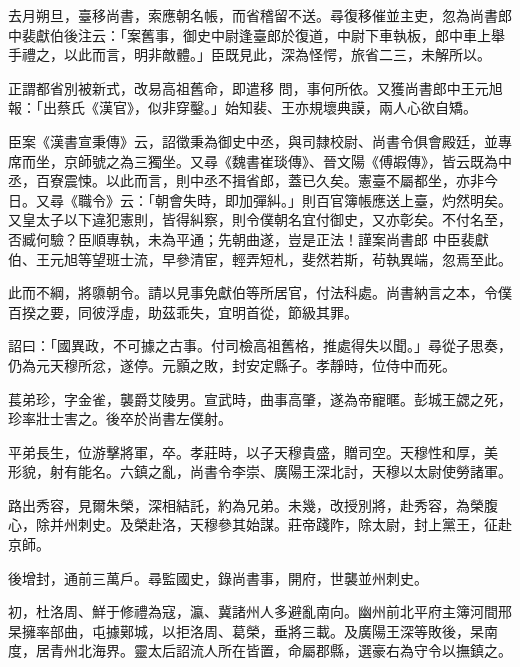 \begin{pinyinscope}
 去月朔旦，臺移尚書，索應朝名帳，而省稽留不送。尋復移催並主吏，忽為尚書郎中裴獻伯後注云：「案舊事，御史中尉逢臺郎於復道，中尉下車執板，郎中車上舉手禮之，以此而言，明非敵體。」臣既見此，深為怪愕，旅省二三，未解所以。



 正謂都省別被新式，改易高祖舊命，即遣移
 問，事何所依。又獲尚書郎中王元旭報：「出蔡氏《漢官》，似非穿鑿。」始知裴、王亦規壞典謨，兩人心欲自矯。



 臣案《漢書宣秉傳》云，詔徵秉為御史中丞，與司隸校尉、尚書令俱會殿廷，並專席而坐，京師號之為三獨坐。又尋《魏書崔琰傳》、晉文陽《傅嘏傳》，皆云既為中丞，百寮震悚。以此而言，則中丞不揖省郎，蓋已久矣。憲臺不屬都坐，亦非今日。又尋《職令》云：「朝會失時，即加彈糾。」則百官簿帳應送上臺，灼然明矣。又皇太子以下違犯憲則，皆得糾察，則令僕朝名宜付御史，又亦彰矣。不付名至，否臧何驗？臣順專執，未為平通；先朝曲遂，豈是正法！謹案尚書郎
 中臣裴獻伯、王元旭等望班士流，早參清宦，輕弄短札，斐然若斯，茍執異端，忽焉至此。



 此而不綱，將隳朝令。請以見事免獻伯等所居官，付法科處。尚書納言之本，令僕百揆之要，同彼浮虛，助茲乖失，宜明首從，節級其罪。



 詔曰：「國異政，不可據之古事。付司檢高祖舊格，推處得失以聞。」尋從子思奏，仍為元天穆所忿，遂停。元顥之敗，封安定縣子。孝靜時，位侍中而死。



 萇弟珍，字金雀，襲爵艾陵男。宣武時，曲事高肇，遂為帝寵暱。彭城王勰之死，珍率壯士害之。後卒於尚書左僕射。



 平弟長生，位游擊將軍，卒。孝莊時，以子天穆貴盛，贈司空。天穆性和厚，美
 形貌，射有能名。六鎮之亂，尚書令李崇、廣陽王深北討，天穆以太尉使勞諸軍。



 路出秀容，見爾朱榮，深相結託，約為兄弟。未幾，改授別將，赴秀容，為榮腹心，除并州刺史。及榮赴洛，天穆參其始謀。莊帝踐阼，除太尉，封上黨王，征赴京師。



 後增封，通前三萬戶。尋監國史，錄尚書事，開府，世襲並州刺史。



 初，杜洛周、鮮于修禮為寇，瀛、冀諸州人多避亂南向。幽州前北平府主簿河間邢杲擁率部曲，屯據鄚城，以拒洛周、葛榮，垂將三載。及廣陽王深等敗後，杲南度，居青州北海界。靈太后詔流人所在皆置，命屬郡縣，選豪右為守令以撫鎮之。




\end{pinyinscope}

